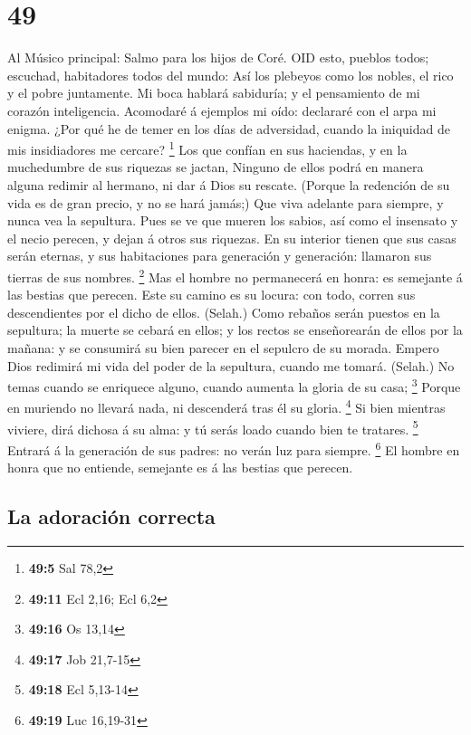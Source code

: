 \hypertarget{section-48}{%
\section{49}\label{section-48}}

 Al Músico principal: Salmo para los hijos de Coré. OID
esto, pueblos todos; escuchad, habitadores todos del mundo: 
Así los plebeyos como los nobles, el rico y el pobre juntamente.
 Mi boca hablará sabiduría; y el pensamiento de mi corazón
inteligencia.  Acomodaré á ejemplos mi oído: declararé con
el arpa mi enigma.  ¿Por qué he de temer en los días de
adversidad, cuando la iniquidad de mis insidiadores me cercare?
\footnote{\textbf{49:5} Sal 78,2}  Los que confían en sus
haciendas, y en la muchedumbre de sus riquezas se jactan, 
Ninguno de ellos podrá en manera alguna redimir al hermano, ni dar á
Dios su rescate.  (Porque la redención de su vida es de gran
precio, y no se hará jamás;)  Que viva adelante para
siempre, y nunca vea la sepultura.  Pues se ve que mueren
los sabios, así como el insensato y el necio perecen, y dejan á otros
sus riquezas.  En su interior tienen que sus casas serán
eternas, y sus habitaciones para generación y generación: llamaron sus
tierras de sus nombres. \footnote{\textbf{49:11} Ecl 2,16; Ecl 6,2}
 Mas el hombre no permanecerá en honra: es semejante á las
bestias que perecen.  Este su camino es su locura: con
todo, corren sus descendientes por el dicho de ellos. (Selah.)
 Como rebaños serán puestos en la sepultura; la muerte se
cebará en ellos; y los rectos se enseñorearán de ellos por la mañana: y
se consumirá su bien parecer en el sepulcro de su morada. 
Empero Dios redimirá mi vida del poder de la sepultura, cuando me
tomará. (Selah.)  No temas cuando se enriquece alguno,
cuando aumenta la gloria de su casa; \footnote{\textbf{49:16} Os 13,14}
 Porque en muriendo no llevará nada, ni descenderá tras él
su gloria. \footnote{\textbf{49:17} Job 21,7-15}  Si bien
mientras viviere, dirá dichosa á su alma: y tú serás loado cuando bien
te tratares. \footnote{\textbf{49:18} Ecl 5,13-14}  Entrará
á la generación de sus padres: no verán luz para siempre. \footnote{\textbf{49:19}
  Luc 16,19-31}  El hombre en honra que no entiende,
semejante es á las bestias que perecen.

\hypertarget{la-adoraciuxf3n-correcta}{%
\subsection{La adoración correcta}\label{la-adoraciuxf3n-correcta}}

